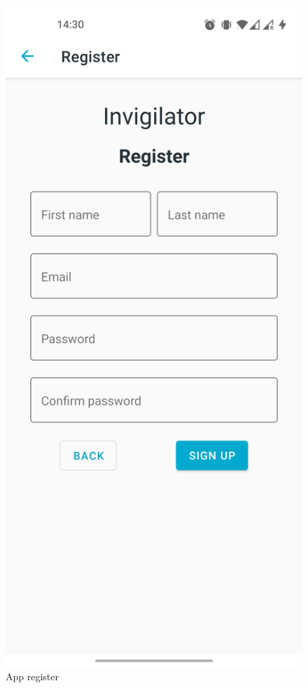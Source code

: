 \begin{minipage}{.5\textwidth}
\begin{figure}[H]
    \centering
    \includegraphics[width=\textwidth]{appendix/imgs/app-register.jpg}
    \caption{App register}
    \label{fig:app-register}
\end{figure}
\end{minipage}

